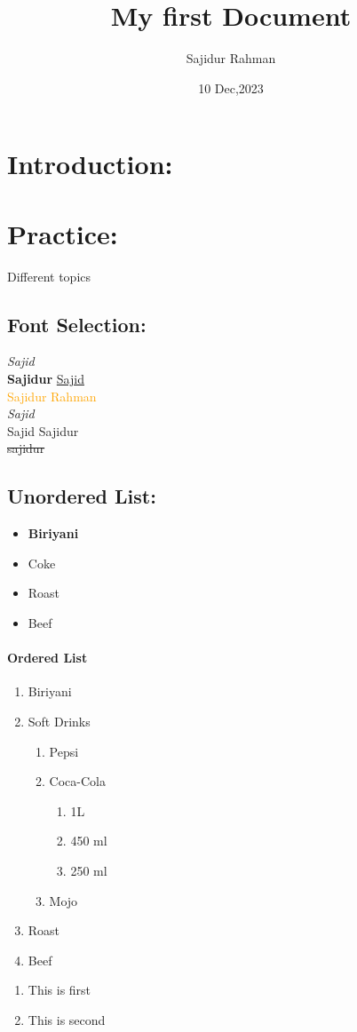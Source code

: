\documentclass[12pt,a4paper]{article}
\title{My first Document}
\author{Sajidur Rahman}
\date{10 Dec,2023}
\begin{document}
\section{Introduction:}
\lipsum[2]
\section{Practice:}
Different topics

\subsection{Font Selection:}
{\it Sajid}\\
\textbf{Sajidur}\break
\underline{Sajid}\\
\textcolor{orange}{Sajidur Rahman}\\
\emph{Sajid}\\
\textrm{Sajid} \textsf{Sajidur}\\
\sout{sajidur}



\subsection{Unordered List:}
\begin{itemize}
    \item {\bf Biriyani}
    \item {\Large Coke}
    \item Roast
    \item Beef
\end{itemize}


\paragraph*{Ordered List}

\begin{enumerate}
    \item Biriyani
    \item Soft Drinks
          \begin{enumerate}[i]
              \item Pepsi
              \item Coca-Cola
                    \begin{enumerate}[a]
                        \item 1L
                        \item 450 ml
                        \item 250 ml
                    \end{enumerate}
              \item Mojo
          \end{enumerate}
    \item Roast
    \item Beef
\end{enumerate}

\begin{enumerate}[{Problem(a):}]
    \item This is first
    \item This is second
\end{enumerate}
\end{document}

